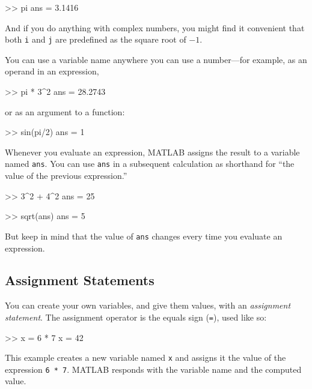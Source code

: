 \begin{code}
>> pi
ans = 3.1416
\end{code}

And if you do anything with complex numbers, you might find it
convenient that both \lstinline{i} and \lstinline{j} are predefined as the square
root of $-1$.


You can use a variable name anywhere you can use a number---for example, as
an operand in an expression,

\begin{code}
>> pi * 3^2
ans = 28.2743
\end{code}
or as an argument to a function:

\begin{code}
>> sin(pi/2)
ans = 1
\end{code}


Whenever you evaluate an expression, MATLAB assigns the result to
a variable named \lstinline{ans}.  You can use \lstinline{ans} in a subsequent
calculation as shorthand for ``the value of the previous expression.''

\begin{code}
>> 3^2 + 4^2
ans = 25

>> sqrt(ans)
ans = 5
\end{code}

But keep in mind that the value of \lstinline{ans} changes every time
you evaluate an expression.


\subsection{Assignment Statements}

You can create your own variables, and give them values, with
an \emph{assignment statement}.  The assignment operator is the
equals sign (\lstinline{=}), used like so:


\begin{code}
>> x = 6 * 7
x = 42
\end{code}

This example creates a new variable named \lstinline{x} and assigns it the
value of the expression \lstinline{6 * 7}.  MATLAB responds with the
variable name and the computed value.

